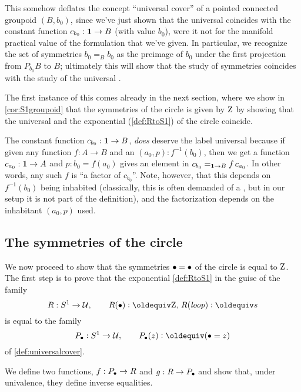 \begin{remark}
  This somehow deflates the concept ``universal cover'' of a pointed connected groupoid $(B,b_0)$, since we've just shown that the universal \covering coincides with the constant function $c_{b_0}:\mathbf{1}\to B$ (with value $b_0$), were it not for the manifold practical value of the formulation that we've given.  
In particular, we recognize the set of symmetries $b_0=_Bb_0$ as the preimage of $b_0$ under the first projection from $P_{b_0}B$ to $B$; ultimately this will show that the study of symmetries coincides with the study of the universal \covering.

The first instance of this comes already in the next section, where we show in \cref{cor:S1groupoid} that the symmetries of the circle is given by $\mathrm{Z}$ by showing that the universal \covering and the exponential \covering (\cref{def:RtoS1}) of the circle coincide.
\end{remark}
\begin{remark}
  The constant function $c_{b_0}:\mathbf{1}\to B$, \emph{does} deserve the label universal because if given any function $f:A\to B$ and an $(a_0,p): f^{-1}(b_0)$, then we get a function $c_{a_0}:\mathbf{1}\to A$ and $p:b_0=f(a_0)$ gives an element in $c_{b_0}=_{\mathbf{1}\to B}f\, c_{a_0}$.  In other words, any such $f$ is ``a factor of $c_{b_0}$''.  
Note, however, that this depends on $f^{-1}(b_0)$ being inhabited (classically, this is often demanded of a \covering, but in our setup it is not part of the definition), and the factorization depends on the inhabitant $(a_0,p)$ used. 
\end{remark}




\subsection{The symmetries of the circle}
\label{sec:symcirc}
We now proceed to show that the symmetries $\bullet=\bullet$ of the circle is equal to $\mathrm{Z}$.  The first step is to prove that the exponential \covering \cref{def:RtoS1} in the guise of the family 
$$R: \Sc\to\UU,\qquad R(\base)\defequi\zet,\, R(\Sloop)\defequi s$$
is equal to the family
$$P_\base:\Sc\to\UU,\qquad P_\base(z)\defequi (\base=z)$$
of \cref{def:universalcover}.

We define two functions, $f:P_\bullet\to R$ and $g:R\to P_\bullet$ and show that, under univalence, they define inverse equalities.  

